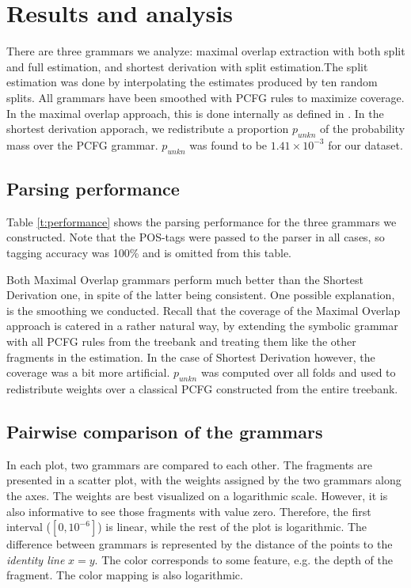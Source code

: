 \section{Results and analysis}\label{sec:Results}

There are three grammars we analyze: maximal overlap extraction with both split and full estimation, and shortest derivation with split estimation.The split estimation was done by interpolating the estimates produced by ten random splits.  All grammars have been smoothed with PCFG rules to maximize coverage. In the maximal overlap approach, this is done internally as defined in \ddop{}. In the shortest derivation apporach, we redistribute a proportion $p_{unkn}$ of the probability mass over the PCFG grammar. $p_{unkn}$ was found to be $1.41\times 10^{-3}$ for our dataset.%


\subsection{Parsing performance}

\begin{table}
\center

\label{t:performance}
\end{table}

Table \ref{t:performance} shows the parsing performance for the three grammars we constructed. Note that the POS-tags were passed to the parser in all cases, so tagging accuracy was 100\% and is omitted from this table. %

Both Maximal Overlap grammars perform much better than the Shortest Derivation one, in spite of the latter being consistent. 
One possible explanation, is the smoothing we conducted. Recall that the coverage of the Maximal Overlap approach is catered in a rather natural way, by extending the symbolic grammar with all PCFG rules from the treebank and treating them like the other fragments in the estimation. In the case of Shortest Derivation however, the coverage was a bit more artificial. $p_{unkn}$ was computed over all folds and used to redistribute weights over a classical PCFG constructed from the entire treebank. 


\subsection{Pairwise comparison of the grammars}
In each plot, two grammars are compared to each other. The fragments are presented in a scatter plot, with the weights assigned by the two grammars along the axes. The weights are best visualized on a logarithmic scale. However, it is also informative to see those fragments with value zero. Therefore, the first interval ($[0,10^{-6}]$) is linear, while the rest of the plot is logarithmic. 
The difference between grammars is represented by the distance of the points to the \emph{identity line} $x=y$.
The color corresponds to some feature, e.g. the depth of the fragment. The color mapping is also logarithmic. 

